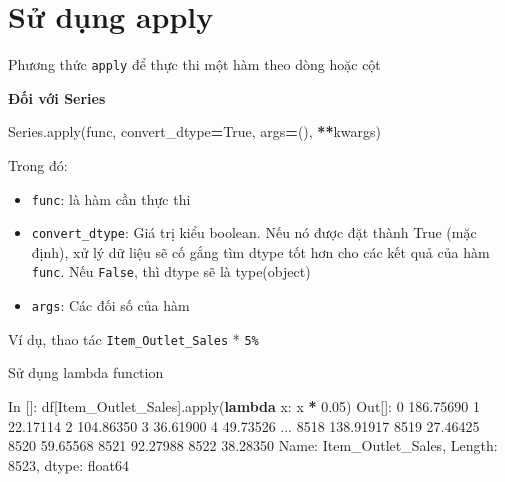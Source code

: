 \documentclass[
]{book}
\newenvironment{Shaded}{\begin{snugshade}}{\end{snugshade}}
\newcommand{\BuiltInTok}[1]{#1}
\newcommand{\DecValTok}[1]{\textcolor[rgb]{0.00,0.00,0.81}{#1}}
\newcommand{\FloatTok}[1]{\textcolor[rgb]{0.00,0.00,0.81}{#1}}
\newcommand{\KeywordTok}[1]{\textcolor[rgb]{0.13,0.29,0.53}{\textbf{#1}}}
\newcommand{\NormalTok}[1]{#1}
\newcommand{\OperatorTok}[1]{\textcolor[rgb]{0.81,0.36,0.00}{\textbf{#1}}}
\newcommand{\StringTok}[1]{\textcolor[rgb]{0.31,0.60,0.02}{#1}}
\newcommand{\VariableTok}[1]{\textcolor[rgb]{0.00,0.00,0.00}{#1}}
\begin{document}
\section{Sử dụng apply}\label{sux1eed-dux1ee5ng-apply}

Phương thức \texttt{apply} để thực thi một hàm theo dòng hoặc cột

\textbf{Đối với Series}

\begin{Shaded}
\begin{Highlighting}[]
\NormalTok{Series.}\BuiltInTok{apply}\NormalTok{(func, convert\_dtype}\OperatorTok{=}\VariableTok{True}\NormalTok{, args}\OperatorTok{=}\NormalTok{(), }\OperatorTok{**}\NormalTok{kwargs)}
\end{Highlighting}
\end{Shaded}

Trong đó:

\begin{itemize}
\item
  \texttt{func}: là hàm cần thực thi
\item
  \texttt{convert\_dtype}: Giá trị kiểu boolean. Nếu nó được đặt thành True (mặc định), xử lý dữ liệu sẽ cố gắng tìm dtype tốt hơn cho các kết quả của hàm \texttt{func}. Nếu \texttt{False}, thì dtype sẽ là type(object)
\item
  \texttt{args}: Các đối số của hàm
\end{itemize}

Ví dụ, thao tác \texttt{Item\_Outlet\_Sales} * \texttt{5\%}

Sử dụng lambda function

\begin{Shaded}
\begin{Highlighting}[]
\NormalTok{In []: df[}\StringTok{\textquotesingle{}Item\_Outlet\_Sales\textquotesingle{}}\NormalTok{].}\BuiltInTok{apply}\NormalTok{(}\KeywordTok{lambda}\NormalTok{ x: x }\OperatorTok{*} \FloatTok{0.05}\NormalTok{)}
\NormalTok{Out[]:}
\DecValTok{0}       \FloatTok{186.75690}
\DecValTok{1}        \FloatTok{22.17114}
\DecValTok{2}       \FloatTok{104.86350}
\DecValTok{3}        \FloatTok{36.61900}
\DecValTok{4}        \FloatTok{49.73526}
\NormalTok{          ...    }
\DecValTok{8518}    \FloatTok{138.91917}
\DecValTok{8519}     \FloatTok{27.46425}
\DecValTok{8520}     \FloatTok{59.65568}
\DecValTok{8521}     \FloatTok{92.27988}
\DecValTok{8522}     \FloatTok{38.28350}
\NormalTok{Name: Item\_Outlet\_Sales, Length: }\DecValTok{8523}\NormalTok{, dtype: float64}
\end{Highlighting}
\end{Shaded}
\end{document}
